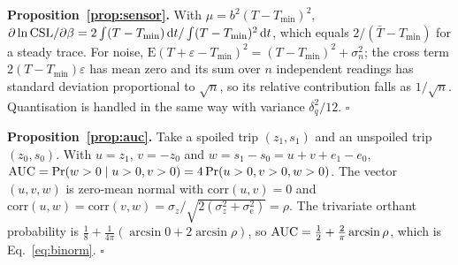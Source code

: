 \textbf{Proposition~\ref{prop:sensor}.} With $\mu=b^2(T-T_{\min})^2$, $\partial\ln\mathrm{CSL}/\partial\beta=2\int(T-T_{\min})\,\mathrm{d} t/\int(T-T_{\min})^2\,\mathrm{d} t$, which equals $2/(\bar T-T_{\min})$ for a steady trace. For noise, $\mathrm E(T+\varepsilon-T_{\min})^2=(T-T_{\min})^2+\sigma_n^2$; the cross term $2(T-T_{\min})\varepsilon$ has mean zero and its sum over $n$ independent readings has standard deviation proportional to $\sqrt n$, so its relative contribution falls as $1/\sqrt n$. Quantisation is handled in the same way with variance $\delta_q^2/12$. \hfill$\square$

\textbf{Proposition~\ref{prop:auc}.} Take a spoiled trip $(z_1,s_1)$ and an unspoiled trip $(z_0,s_0)$. With $u=z_1$, $v=-z_0$ and $w=s_1-s_0=u+v+e_1-e_0$, $\mathrm{AUC}=\Pr(w>0\mid u>0,v>0)=4\Pr(u>0,v>0,w>0)$. The vector $(u,v,w)$ is zero-mean normal with $\mathrm{corr}(u,v)=0$ and $\mathrm{corr}(u,w)=\mathrm{corr}(v,w)=\sigma_z/\sqrt{2(\sigma_z^2+\sigma_\mathrm{e}^2)}=\rho$. The trivariate orthant probability is $\tfrac18+\tfrac{1}{4\pi}(\arcsin0+2\arcsin\rho)$, so $\mathrm{AUC}=\tfrac12+\tfrac{2}{\pi}\arcsin\rho$, which is Eq.~\eqref{eq:binorm}. \hfill$\square$


